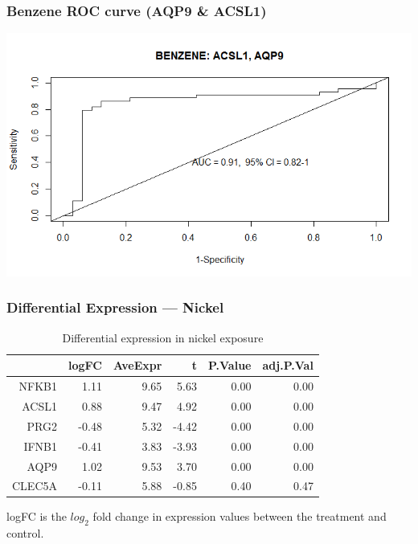 \documentclass{beamer}
\begin{document}
\begin{frame}
	\frametitle{Benzene ROC curve (AQP9 \& ACSL1)}
		\centering
	 	\includegraphics[scale=0.45]{../paper/figs/benzene1.png} 
\end{frame}

\begin{frame}[fragile]
  	\frametitle{Differential Expression --- Nickel}
 		\begin{table}[ht]
		\caption {Differential expression in nickel exposure} \label{tab:nickel} 
		\centering
		\begin{tabular}{rrrrrr}
 			\hline
 			& logFC & AveExpr & t & P.Value & adj.P.Val \\ 
  			\hline
			NFKB1 & 1.11 & 9.65 & 5.63 & 0.00 & 0.00 \\ 
  			ACSL1 & 0.88 & 9.47 & 4.92 & 0.00 & 0.00 \\ 
  			PRG2 & -0.48 & 5.32 & -4.42 & 0.00 & 0.00 \\ 
  			IFNB1 & -0.41 & 3.83 & -3.93 & 0.00 & 0.00 \\ 
  			AQP9 & 1.02 & 9.53 & 3.70 & 0.00 & 0.00 \\ 
  			CLEC5A & -0.11 & 5.88 & -0.85 & 0.40 & 0.47 \\ 
  			 \hline
		\end{tabular}
		\end{table}
		\small logFC is the $log_{2}$ fold change in expression values between the treatment and control.
\end{frame}
\end{document}
